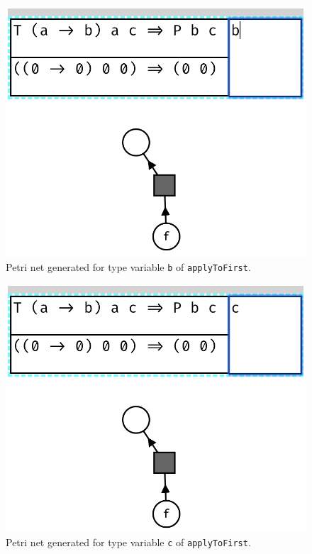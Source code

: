 \documentclass[11pt,openright,hidelinks,a4paper]{article}
\begin{document}
\begin{figure}[H]
\begin{center}
\includegraphics[scale=0.45]{applytofirstb}
\end{center}
\caption{Petri net generated for type variable \lstinline{b} of \lstinline{applyToFirst}.}
\label{fig:applyToFirstB}
\end{figure}

\begin{figure}[H]
\begin{center}
\includegraphics[scale=0.45]{applytofirstc}
\end{center}
\caption{Petri net generated for type variable \lstinline{c} of \lstinline{applyToFirst}.}
\label{fig:applyToFirstC}
\end{figure}
\end{document}
